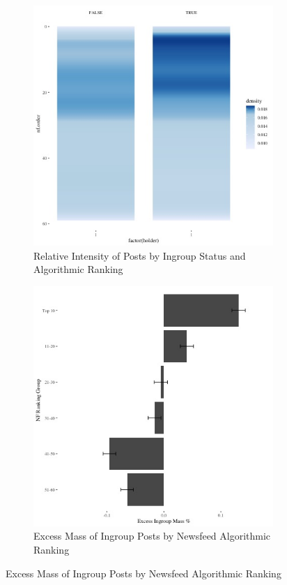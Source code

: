 \documentclass[12pt,letterpaper]{article}
\begin{document}
\begin{figure}[ht]
\caption{Relationship between Newsfeed Algorithmic Ranking and Ingroup Status of Posts}
\label{fig:nf_bygroup}
    \begin{subfigure}{.5\textwidth} 
        \centering
        \includegraphics[width=1\linewidth]{Output/Graphs/Audit/Heatmaps/US NF nf rank by ingroup - smooth.jpg}  
        \caption{Relative Intensity of Posts by Ingroup Status and Algorithmic Ranking}
        \label{fig:nf_bygroup_hm}
        \end{subfigure}
    \begin{subfigure}{.5\textwidth}
        \centering
        \includegraphics[width=.9\linewidth]{Output/Graphs/Audit/Excess Mass/US NF excess mass by ranking group.jpg}  
        \caption{Excess Mass of Ingroup Posts by Newsfeed Algorithmic Ranking}
        \label{fig:nf_bygroup_em}
    \end{subfigure}


\end{figure}
\end{document}
